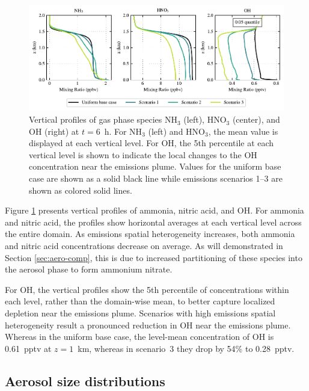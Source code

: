 \documentclass[journal abbreviation, manuscript]{copernicus}
\begin{document}
\begin{figure}[!h]
	\centering
	\includegraphics[]{figures/aerosol-gas-vertical-profiles-time36.pdf}
	\caption{Vertical profiles of gas phase species NH$_3$ (left),
          HNO$_3$ (center), and OH (right) at $t=6$~h. For NH$_3$
          (left) and HNO$_3$, the mean value is displayed at each
          vertical level. For OH, the 5th percentile at each vertical
          level is shown to indicate the local changes to the OH
          concentration near the emissions plume. Values for the
          uniform base case are shown as a solid black line while
          emissions scenarios 1--3 are shown as colored solid lines.}
	\label{fig:gas-profiles}
\end{figure} 

Figure \ref{fig:gas-profiles} presents vertical profiles of ammonia,
nitric acid, and OH. For ammonia and nitric acid, the profiles show
horizontal averages at each vertical level across the entire domain.
As emissions spatial heterogeneity increases, both ammonia and nitric
acid concentrations decrease on average. As will demonstrated in
Section \ref{sec:aero-comp}, this is due to increased partitioning of
these species into the aerosol phase to form ammonium nitrate.

For OH, the vertical profiles show the 5th percentile of
concentrations within each level, rather than the domain-wise mean, to
better capture localized depletion near the emissions plume. Scenarios
with high emissions spatial heterogeneity result a pronounced
reduction in OH near the emissions plume. Whereas in the uniform base
case, the level-mean concentration of OH is 0.61~pptv at $z=1$~km,
whereas in scenario~3 they drop by 54\%
to 0.28~pptv.

\subsection{Aerosol size distributions}\label{sec:size-dist}
\end{document}
